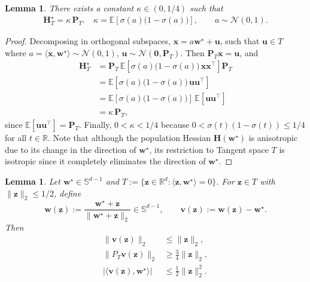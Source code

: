 \documentclass{article}
\theoremstyle{plain}
\newtheorem{lemma}[theorem]{Lemma}
\theoremstyle{definition}
\theoremstyle{remark}
\begin{document}
{\begin{lemma}
\label{lem:isotropic-hessian-tangent}
There exists a constant $\kappa \in (0,1/4)$ such that
\begin{align}
\mathbf{H}_T^\star = \kappa\, \mathbf{P}_T. \quad \kappa = \mathbb{E}\!\left[\sigma(a)\big(1-\sigma(a)\big)\right],
\qquad
a \sim \mathcal{N}(0,1).
\end{align} 
\end{lemma}
\begin{proof}
Decomposing in orthogonal subspaces, $\mathbf{x} = a \mathbf{w}^\star + \mathbf{u}$, such that $\mathbf{u} \in T$ where $a =  \langle \mathbf{x}, \mathbf{w}^\star \rangle \sim \mathcal{N}(0,1)$, $\mathbf{u} \sim \mathcal{N}(\mathbf{0}, \mathbf{P}_T)$. Then $\mathbf{P}_T \mathbf{x} = \mathbf{u}$, and
\begin{align}
\mathbf{H}_T^\star
&= \mathbf{P}_T \,\mathbb{E}\!\left[
\sigma(a)\big(1-\sigma(a)\big)\,\mathbf{x}\mathbf{x}^{\top}
\right] \mathbf{P}_T \\
&= \mathbb{E}\!\left[\sigma(a)\big(1-\sigma(a)\big)\,\mathbf{u}\mathbf{u}^{\top}\right] \\
&= \mathbb{E}\!\left[\sigma(a)\big(1-\sigma(a)\big)\right]\,
\mathbb{E}\!\left[\mathbf{u}\mathbf{u}^{\top}\right] \\
&= \kappa\, \mathbf{P}_T,
\end{align}
since $\mathbb{E}[\mathbf{u}\mathbf{u}^{\top}] = \mathbf{P}_T$.
Finally, $0 < \kappa < 1/4$ because $0 < \sigma(t)(1-\sigma(t)) \le 1/4$ for all $t\in\mathbb{R}$.
Note that although the population Hessian $\mathbf{H}(\mathbf{w}^{\star})$ is anisotropic due to its change in the direction of $\mathbf{w}^{\star}$, its restriction to Tangent space $T$ is isotropic since it completely eliminates the direction of $\mathbf{w}^{\star}$. 
\end{proof}

\begin{lemma}
\label{lem:chart_geometry}
Let $\mathbf w^\star\in\mathbb S^{d-1}$ and $T:=\{\mathbf z\in\mathbb R^d:\langle \mathbf z,\mathbf w^\star\rangle=0\}$.
For $\mathbf z\in T$ with $\|\mathbf z\|_2\le 1/2$, define
\[
\mathbf w(\mathbf z):=\frac{\mathbf w^\star+\mathbf z}{\|\mathbf w^\star+\mathbf z\|_2}\in\mathbb S^{d-1},
\qquad
\mathbf v(\mathbf z):=\mathbf w(\mathbf z)-\mathbf w^\star.
\]
Then
\begin{align}
\|\mathbf v(\mathbf z)\|_2 &\le \|\mathbf z\|_2, \label{eq:v_le_z}\\
\|P_T \mathbf v(\mathbf z)\|_2 &\ge \frac{3}{4}\|\mathbf z\|_2, \label{eq:PTv_ge_z}\\
\big|\langle \mathbf v(\mathbf z),\mathbf w^\star\rangle\big|
&\le \frac{1}{2}\|\mathbf z\|_2^2. \label{eq:normal_small}
\end{align}
\end{lemma}

}
\end{document}
